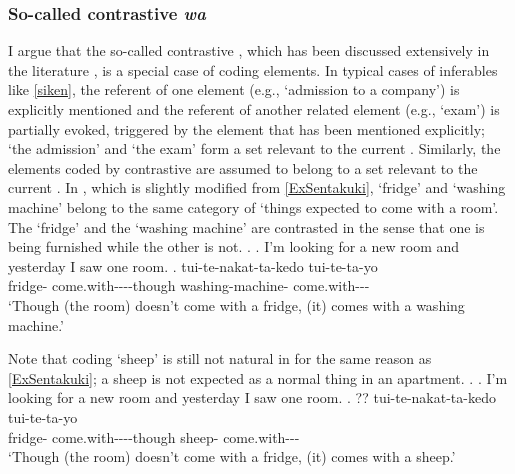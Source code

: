 \subsubsection{So-called contrastive \textit{wa}}


I argue that the so-called contrastive ,
which has been discussed extensively in the literature \cite[e.g.,][]{kuno73},
is a special case of  coding  elements.
In typical cases of inferables like \ref{siken},
the referent of one element (e.g.,  `admission to a company') is explicitly mentioned and the referent of another related element (e.g.,  `exam') is partially evoked, triggered by the element that has been mentioned explicitly;
`the admission' and `the exam' form a set relevant to the current .
Similarly, the elements coded by contrastive 
are assumed to belong to a set relevant to the current .
In \Next, which is slightly modified from \ref{ExSentakuki},
 `fridge' and  `washing machine' belong to the same category of `things expected to come with a room'.
The `fridge' and the `washing machine' are contrasted
in the sense that
one is being furnished while the other is not.
%
\ex.
 \a. I'm looking for a new room and yesterday I saw one room.
 \bg.  tui-te-nakat-ta-kedo  tui-te-ta-yo \\
 	fridge- come.with----though washing-machine- come.with--- \\
	`Though (the room) doesn't come with a fridge, (it) comes with a washing machine.'

Note that  coding  `sheep' is still not natural in \Next
for the same reason as \ref{ExSentakuki};
a sheep is not expected as a normal thing in an apartment.
%
\ex.
 \a. I'm looking for a new room and yesterday I saw one room.
 \bg. ?? tui-te-nakat-ta-kedo  tui-te-ta-yo \\
 	fridge- come.with----though sheep- come.with--- \\
	`Though (the room) doesn't come with a fridge, (it) comes with a sheep.'

